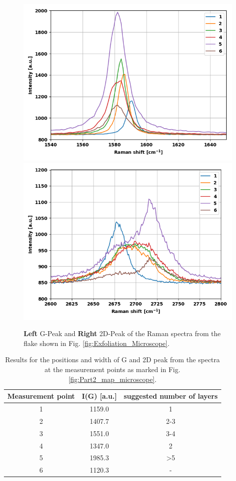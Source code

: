 \documentclass[12pt,a4paper]{article}
\begin{document}
\begin{figure}
\centering
\includegraphics[scale=0.5]{Bilder/Exfoliation/2_mono_bi_tri_flake_G_peaks.PNG}
\includegraphics[scale=0.5]{Bilder/Exfoliation/2_mono_bi_tri_flake_2D_peaks.PNG}
\caption{\textbf{Left} G-Peak and \textbf{Right} 2D-Peak of the Raman spectra from the flake shown in Fig. \ref{fig:Exfoliation_Microscope}.}
\label{fig:Exfoliation_Peaks}
\end{figure}

\begin{table}[h]
\centering
\begin{tabular}{|c|c|c|}
\hline 
Measurement point & I(G) [a.u.] & suggested number of layers \\ 
\hline 
1 & 1159.0 & 1 \\ 
\hline 
2 & 1407.7 & 2-3 \\ 
\hline 
3 & 1551.0 & 3-4 \\ 
\hline 
4 & 1347.0 & 2 \\ 
\hline 
5 & 1985.3 & >5 \\
\hline 
6 & 1120.3 & -  \\ 
\hline 
\end{tabular} 
\caption{Results for the positions and width of G and 2D peak from the spectra at the measurement points as marked in Fig. \ref{fig:Part2_map_microscope}.}
\label{tab:step_G_intensities}
\end{table}
\end{document}
